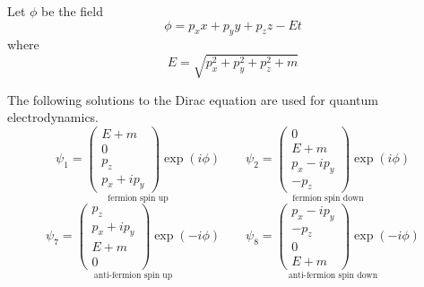 \documentclass[12pt]{article}
\begin{document}
\noindent
Let $\phi$ be the field
\begin{equation*}
\phi=p_xx+p_yy+p_zz-Et
\end{equation*}
where
\begin{equation*}
E=\sqrt{p_x^2+p_y^2+p_z^2+m}
\end{equation*}

\noindent
The following solutions to the Dirac equation are used for quantum electrodynamics.
\begin{equation*}
\underset{\text{fermion spin up}}
{
\psi_1=\begin{pmatrix}E+m\\0\\p_z\\p_x+ip_y\end{pmatrix}
\exp(i\phi)
}
\qquad
\underset{\text{fermion spin down}}
{
\psi_2=\begin{pmatrix}0\\E+m\\p_x-ip_y\\-p_z\end{pmatrix}
\exp(i\phi)
}
\end{equation*}
\begin{equation*}
\underset{\text{anti-fermion spin up}}
{
\psi_7=\begin{pmatrix}p_z\\p_x+ip_y\\E+m\\0\end{pmatrix}
\exp(-i\phi)
}
\qquad
\underset{\text{anti-fermion spin down}}
{
\psi_8=\begin{pmatrix}p_x-ip_y\\-p_z\\0\\E+m\end{pmatrix}
\exp(-i\phi)
}
\end{equation*}
\end{document}
